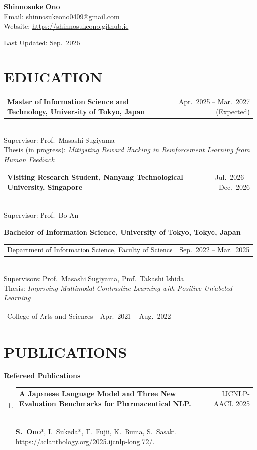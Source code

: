\documentclass[11pt,a4paper]{article}
\makeatletter
\newcommand{\entry}[2]{%
  \noindent\begin{tabularx}{\linewidth}{@{}Xr@{}}#1 & #2\end{tabularx}%
}
\makeatother
\begin{document}
\begin{center}
	{\LARGE\bfseries Shinnosuke Ono}\\[4pt]
	Email: \href{mailto:shinnosukeono0409@gmail.com}{shinnosukeono0409@gmail.com}\\
	Website: \href{https://shinnosukeono.github.io}{https://shinnosukeono.github.io}
\end{center}
\noindent Last Updated: Sep.\ 2026

\section{EDUCATION}

\entry{\textbf{Master of Information Science and Technology, University of Tokyo, Japan}}{Apr.\ 2025 -- Mar.\ 2027 (Expected)}\\
Supervisor: Prof.\ Masashi Sugiyama\\
Thesis (in progress): \textit{Mitigating Reward Hacking in Reinforcement Learning from Human Feedback}

\medskip
\entry{\textbf{Visiting Research Student, Nanyang Technological University, Singapore}}{Jul.\ 2026 -- Dec.\ 2026}\\
Supervisor: Prof.\ Bo An

\medskip
\noindent\textbf{Bachelor of Information Science, University of Tokyo, Tokyo, Japan}\\
\entry{Department of Information Science, Faculty of Science}{Sep.\ 2022 -- Mar.\ 2025}\\
Supervisors: Prof.\ Masashi Sugiyama, Prof.\ Takashi Ishida\\
Thesis: \textit{Improving Multimodal Contrastive Learning with Positive-Unlabeled Learning}\\
\entry{College of Arts and Sciences}{Apr.\ 2021 -- Aug.\ 2022}

\section{PUBLICATIONS}

\noindent\textbf{Refereed Publications}
\begin{enumerate}[leftmargin=2em]
	\item \entry{\textbf{A Japanese Language Model and Three New Evaluation Benchmarks for Pharmaceutical NLP.}}{IJCNLP-AACL 2025}\\
	      \textbf{\underline{S.\ Ono}}*, I.\ Sukeda*, T.\ Fujii, K.\ Buma, S.\ Sasaki.
	      \href{https://aclanthology.org/2025.ijcnlp-long.72/}{https://aclanthology.org/2025.ijcnlp-long.72/}.
\end{enumerate}
\end{document}
